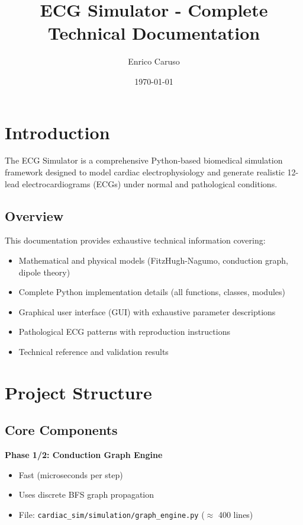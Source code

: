 \documentclass[12pt,a4paper]{article}
\title{ECG Simulator - Complete Technical Documentation}
\author{Enrico Caruso}
\date{\today}
\begin{document}
\maketitle
\tableofcontents
\newpage



\section{Introduction}

The ECG Simulator is a comprehensive Python-based biomedical simulation framework designed to model cardiac electrophysiology and generate realistic 12-lead electrocardiograms (ECGs) under normal and pathological conditions.

\subsection{Overview}

This documentation provides exhaustive technical information covering:
\begin{itemize}
    \item Mathematical and physical models (FitzHugh-Nagumo, conduction graph, dipole theory)
    \item Complete Python implementation details (all functions, classes, modules)
    \item Graphical user interface (GUI) with exhaustive parameter descriptions
    \item Pathological ECG patterns with reproduction instructions
    \item Technical reference and validation results
\end{itemize}

\section{Project Structure}

\subsection{Core Components}

\textbf{Phase 1/2: Conduction Graph Engine}
\begin{itemize}
    \item Fast (microseconds per step)
    \item Uses discrete BFS graph propagation
    \item File: \texttt{cardiac\_sim/simulation/graph\_engine.py} ($\approx$ 400 lines)
\end{itemize}
\end{document}
